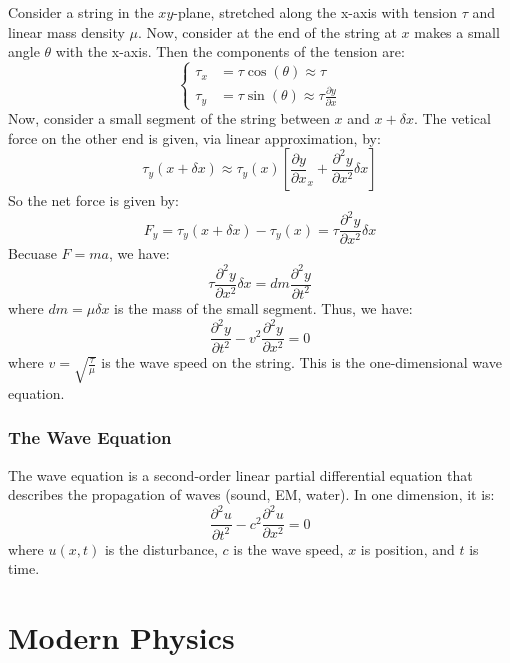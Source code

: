 \documentclass[11pt]{report}
\begin{document}
\begin{example}
    Consider a string in the $xy$-plane, stretched along the x-axis with tension \( \tau \) and linear mass density \( \mu \). Now, consider at the end of the string at $x$ makes a small angle \( \theta \) with the x-axis. Then the components of the tension are:
    $$
    \begin{cases}
        \tau_x &= \tau \cos(\theta) \approx \tau \\
        \tau_y &= \tau \sin(\theta) \approx \tau \frac{\partial y}{\partial x}
    \end{cases}
    $$
    Now, consider a small segment of the string between \( x \) and \( x + \delta x \). The vetical force on the other end is given, via linear approximation, by:
    $$    
        \tau_y(x + \delta x) \approx \tau_y(x) \left[ \frac{\partial y}{\partial x}_x + \frac{\partial^2 y}{\partial x^2} \delta x \right]
    $$
    So the net force is given by:
    $$
        F_y = \tau_y(x + \delta x) - \tau_y(x) = \tau \frac{\partial^2 y}{\partial x^2} \delta x
    $$
    Becuase $F=ma$, we have:
    $$
        \tau \frac{\partial^2 y}{\partial x^2} \delta x = dm \frac{\partial^2 y}{\partial t^2}
    $$
    where \( dm = \mu \delta x \) is the mass of the small segment. Thus, we have:
    $$
        \frac{\partial^2 y}{\partial t^2} - v^2 \frac{\partial^2 y}{\partial x^2} = 0
    $$
    where \( v = \sqrt{\frac{\tau}{\mu}} \) is the wave speed on the string. This is the one-dimensional wave equation.

\end{example}

\subsection{The Wave Equation}

\begin{definition}
    The wave equation is a second-order linear partial differential equation that describes the propagation of waves (sound, EM, water). In one dimension, it is:
    \begin{equation}
        \frac{\partial^2 u}{\partial t^2} - c^2 \frac{\partial^2 u}{\partial x^2} = 0
    \end{equation}
    where $u(x,t)$ is the disturbance, $c$ is the wave speed, $x$ is position, and $t$ is time.
\end{definition}


\chapter{Modern Physics}
\end{document}
